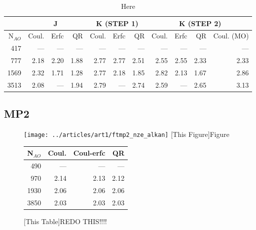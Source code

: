 \begin{table}
\begin{tabular}{r|rrr|rrr|rrrr}
\hline
 & \multicolumn{3}{c}{J} & \multicolumn{3}{c}{K (STEP 1)} &   \multicolumn{4}{c}{K (STEP 2)} \\ \hline
N$_{AO}$ & Coul. & Erfc & QR & Coul. & Erfc & QR & Coul. & Erfc & QR & Coul. (MO) \\ \hline
417 & --- & --- & --- & --- & --- & --- & --- & --- & --- & --- \\ 
777 & 2.18 & 2.20 & 1.88 & 2.77 & 2.77 & 2.51 & 2.55 & 2.55 & 2.33 & 2.33 \\ 
1569 & 2.32 & 1.71 & 1.28 & 2.77 & 2.18 & 1.85 & 2.82 & 2.13 & 1.67 & 2.86 \\ 
3513 & 2.08 & --- & 1.94 & 2.79 & --- & 2.74 & 2.59 & --- & 2.65 & 3.13 \\ \hline
\end{tabular}
\caption{Here}
\label{}
\end{table}

\subsection{MP2}

\begin{figure}
\begin{minipage}{0.5\textwidth}
\texttt{[image: ../articles/art1/ftmp2\_nze\_alkan]}
[This Figure]{Figure}
\end{minipage}
\hspace{0.05\textwidth}
\begin{minipage}{0.3\textwidth}
\begin{tabular}{rrrr}
\hline
N$_{AO}$ & Coul. & Coul-erfc & QR \\ \hline
490 & --- & --- 	& --- \\ 
970	& 2.14 & 2.13 & 2.12 \\
1930	 & 2.06 & 2.06 & 2.06 \\
3850	 & 2.03 & 2.03 & 2.03 \\
 \hline
\end{tabular}
[This Table]{REDO THIS!!!!}
\end{minipage}
\end{figure}

